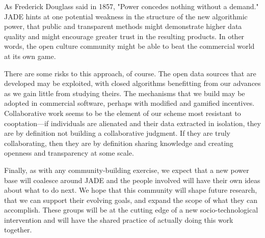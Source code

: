 \documentclass{sigchi-ext}
\begin{document}
As Frederick Douglass said in 1857, "Power concedes nothing without a demand."  JADE hints at one potential weakness in the structure of the new algorithmic power, that public and transparent methods might demonstrate higher data quality and might encourage greater trust in the resulting products.  In other words, the open culture community might be able to beat the commercial world at its own game.

There are some risks to this approach, of course.  The open data sources that are developed may be exploited, with closed algorithms benefitting from our advances as we gain little from studying theirs.  The mechanisms that we build may be adopted in commercial software, perhaps with modified and gamified incentives.  Collaborative work seems to be the element of our scheme most resistant to cooptation---if individuals are alienated and their data extracted in isolation, they are by definition not building a collaborative judgment.  If they are truly collaborating, then they are by definition sharing knowledge and creating openness and transparency at some scale.

Finally, as with any community-building exercise, we expect that a new power base will coalesce around JADE and the people involved will have their own ideas about what to do next.  We hope that this community will shape future research, that we can support their evolving goals, and expand the scope of what they can accomplish.  These groups will be at the cutting edge of a new socio-technological intervention and will have the shared practice of actually doing this work together.

\balance{}



\end{document}
